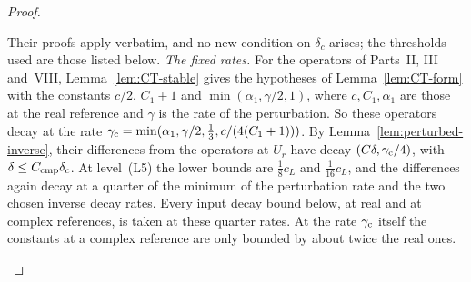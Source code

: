 \begin{proof}
\begin{enumerate}[label=(\roman*)]
  Their proofs apply verbatim, and no new condition on $\delta_c$ arises; the thresholds used are those listed below. \emph{The fixed rates.} For the operators of Parts~II, III and~VIII, Lemma~\ref{lem:CT-stable} gives the hypotheses of Lemma~\ref{lem:CT-form} with the constants $c/2$, $C_1+1$ and $\min(\alpha_1,\gamma/2,1)$, where $c,C_1,\alpha_1$ are those at the real reference and $\gamma$ is the rate of the perturbation. So these operators decay at the rate $\gamma_{\rm c}=\min(\alpha_1,\gamma/2,\frac13,c/(4(C_1+1)))$. By Lemma~\ref{lem:perturbed-inverse}, their differences from the operators at $U_r$ have decay $(C\delta,\gamma_{\rm c}/4)$, with $\delta\le C_{\rm cmp}\delta_c$. At level~(L5) the lower bounds are $\frac18c_L$ and $\frac1{16}c_L$, and the differences again decay at a quarter of the minimum of the perturbation rate and the two chosen inverse decay rates. Every input decay bound below, at real and at complex references, is taken at these quarter rates. At the rate $\gamma_{\rm c}$ itself the constants at a complex reference are only bounded by about twice the real ones.


\end{enumerate}
\end{proof}
